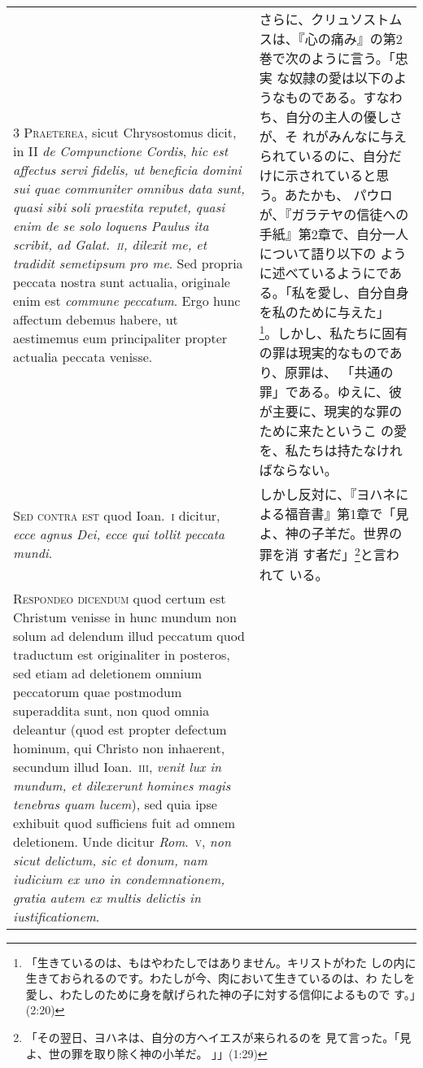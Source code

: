 \documentclass[10pt]{jsarticle} %
\begin{document}
\begin{longtable}{p{21em}p{21em}}
\\


3 {\scshape Praeterea}, sicut Chrysostomus dicit, in II
{\itshape de Compunctione Cordis}, {\itshape hic est affectus servi fidelis, ut beneficia
domini sui quae communiter omnibus data sunt, quasi sibi soli praestita
reputet, quasi enim de se solo loquens Paulus ita scribit, {\itshape ad Galat}.~{\scshape ii},
dilexit me, et tradidit semetipsum pro me}. Sed propria peccata nostra
sunt actualia, originale enim est {\itshape commune peccatum}. Ergo hunc affectum
debemus habere, ut aestimemus eum principaliter propter actualia peccata
venisse.


&

さらに、クリュソストムスは、『心の痛み』の第2巻で次のように言う。「忠実
 な奴隷の愛は以下のようなものである。すなわち、自分の主人の優しさが、そ
 れがみんなに与えられているのに、自分だけに示されていると思う。あたかも、
 パウロが、『ガラテヤの信徒への手紙』第2章で、自分一人について語り以下の
 ように述べているようにである。「私を愛し、自分自身を私のために与えた」
 \footnote{「生きているのは、もはやわたしではありません。キリストがわた
 しの内に生きておられるのです。わたしが今、肉において生きているのは、わ
 たしを愛し、わたしのために身を献げられた神の子に対する信仰によるもので
 す。」(2:20) }。しかし、私たちに固有の罪は現実的なものであり、原罪は、
 「共通の罪」である。ゆえに、彼が主要に、現実的な罪のために来たというこ
 の愛を、私たちは持たなければならない。


\\


{\scshape Sed contra est} quod Ioan.~{\scshape i} dicitur, {\itshape ecce
agnus Dei, ecce qui tollit peccata mundi}.


&

しかし反対に、『ヨハネによる福音書』第1章で「見よ、神の子羊だ。世界の罪を消
 す者だ」\footnote{「その翌日、ヨハネは、自分の方へイエスが来られるのを
 見て言った。「見よ、世の罪を取り除く神の小羊だ。 」」(1:29)}と言われて
 いる。

\\


{\scshape Respondeo dicendum} quod certum est Christum
venisse in hunc mundum non solum ad delendum illud peccatum quod
traductum est originaliter in posteros, sed etiam ad deletionem omnium
peccatorum quae postmodum superaddita sunt, non quod omnia deleantur
(quod est propter defectum hominum, qui Christo non inhaerent, secundum
illud Ioan.~{\scshape iii}, {\itshape venit lux in mundum, et dilexerunt homines magis
tenebras quam lucem}), sed quia ipse exhibuit quod sufficiens fuit ad
omnem deletionem. 
Unde dicitur {\itshape Rom}.~{\scshape v}, {\itshape non sicut delictum, sic et donum,
nam iudicium ex uno in condemnationem, gratia autem ex multis delictis
in iustificationem}. 



\end{longtable}
\end{document}
